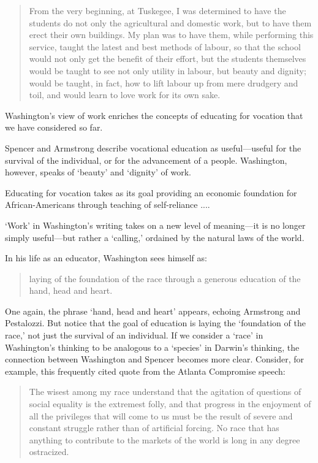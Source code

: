 \begin{quote}

From the very beginning, at Tuskegee, I was determined to have the students do not only the agricultural and domestic work, but to have them erect their own buildings. My plan was to have them, while performing this service, taught the latest and best methods of labour, so that the school would not only get the benefit of their effort, but the students themselves would be taught to see not only utility in labour, but beauty and dignity; would be taught, in fact, how to lift labour up from mere drudgery and toil, and would learn to love work for its own sake. ~\citep[p. 87]{Washington:1952uf}
\end{quote}

Washington's view of work enriches the concepts of educating for vocation that we have considered so far. 

Spencer and Armstrong describe vocational education as useful---useful for the survival of the individual, or for the advancement of a people. Washington, however, speaks of `beauty' and `dignity' of work. 
\begin{purpose}\label{def:forvocation-washington}
Educating for vocation takes as its goal providing an economic foundation for African-Americans through teaching of self-reliance ....
\end{purpose} `Work' in Washington's writing takes on a new level of meaning---it is no longer simply useful---but rather a `calling,' ordained by the natural laws of the world. 

In his life as an educator, Washington sees himself as:

\begin{quote}

laying of the foundation of the race through a generous education of the hand, head and heart. ~\citep[p. 50]{Washington:1952uf}
\end{quote}

One again, the phrase `hand, head and heart' appears, echoing Armstrong and Pestalozzi. But notice that the goal of education is laying the `foundation of the race,' not just the survival of an individual. If we consider a `race' in Washington's thinking to be analogous to a `species' in Darwin's thinking, the connection between Washington and Spencer becomes more clear. Consider, for example, this frequently cited quote from the Atlanta Compromise speech:

\begin{quote}

The wisest among my race understand that the agitation of questions of social equality is the extremest folly, and that progress in the enjoyment of all the privileges that will come to us must be the result of severe and constant struggle rather than of artificial forcing. No race that has anything to contribute to the markets of the world is long in any degree ostracized. ~\citep[p. 131]{Washington:1952uf}
\end{quote}

